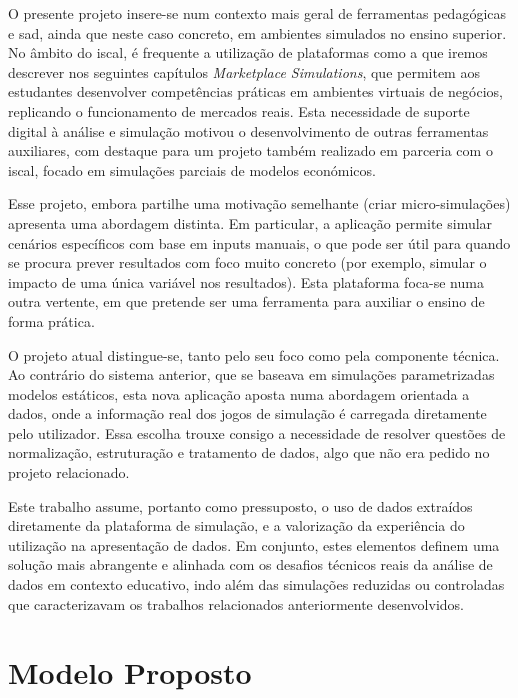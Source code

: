 O presente projeto insere-se num contexto mais geral de ferramentas pedagógicas e \gls{sad}, ainda que neste caso concreto,  em ambientes simulados no ensino superior. No âmbito do \gls{iscal}, é frequente a utilização de plataformas como a que iremos descrever nos seguintes capítulos \textit{Marketplace Simulations}, que permitem aos estudantes desenvolver competências práticas em ambientes virtuais de negócios, replicando o funcionamento de mercados reais. Esta necessidade de suporte digital à análise e simulação motivou o desenvolvimento de outras ferramentas auxiliares, com destaque para um projeto também realizado em parceria com o \gls{iscal}, focado em simulações parciais de modelos económicos.

Esse projeto, embora partilhe uma motivação semelhante (criar micro-simulações) apresenta uma abordagem distinta. Em particular, a aplicação permite simular cenários específicos com base em inputs manuais, o que pode ser útil para quando se procura prever resultados com foco muito concreto (por exemplo, simular o impacto de uma única variável nos resultados). Esta plataforma foca-se numa outra vertente, em que pretende ser uma ferramenta para auxiliar o ensino de forma prática.

O projeto atual distingue-se, tanto pelo seu foco como pela componente técnica. Ao contrário do sistema anterior, que se baseava em simulações parametrizadas modelos estáticos, esta nova aplicação aposta numa abordagem orientada a dados, onde a informação real dos jogos de simulação é carregada diretamente pelo utilizador. Essa escolha trouxe consigo a necessidade de resolver questões de normalização, estruturação e tratamento de dados, algo que não era pedido no projeto relacionado.

Este trabalho assume, portanto como pressuposto, o uso de dados extraídos diretamente da plataforma de simulação, e a valorização da experiência do utilização na apresentação de dados. Em conjunto, estes elementos definem uma solução mais abrangente e alinhada com os desafios técnicos reais da análise de dados em contexto educativo, indo além das simulações reduzidas ou controladas que caracterizavam os trabalhos relacionados anteriormente desenvolvidos.

\chapter{Modelo Proposto}
\label{ch:modeloProposto}

